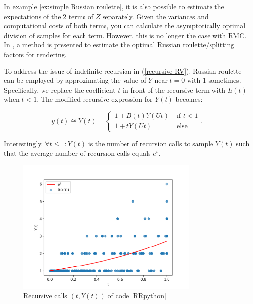 \documentclass[a4paper,12pt]{article}
\begin{document}
\begin{related}
    In example \ref{ex:simple Russian roulette}, it is also
    possible to estimate the expectations of the $2$ terms
    of $Z$ separately. Given the variances and computational costs
    of both terms, you can calculate the asymptotically optimal division
    of samples for each term. However, this is no longer the case with RMC.
    In \cite{rath_ears_2022}, a method is presented to estimate the optimal
    Russian roulette/splitting factors for rendering.
\end{related}


\begin{example} \label{ex: russian roulette}
    To address the issue of indefinite recursion in
    (\ref{recursive RV}), Russian roulette can be employed
    by approximating the value of $Y$ near $t = 0$ with $1$
    sometimes. Specifically, we replace the coefficient $t$
    in front of the recursive term with $B(t)$ when $t < 1$.
    The modified recursive expression for $Y(t)$ becomes:

    \begin{equation}\label{eq:rr example}
        y(t) \cong Y(t) =
        \begin{cases}
            1 + B(t)Y(Ut) & \text{ if } t < 1 \\
            1 + tY(Ut)    & \text{ else}
        \end{cases}.
    \end{equation}
\end{example}

\vspace{0.2cm}

\begin{pythonn} \label{RRpython}
    Interestingly, $\forall t \le 1:Y(t)$ is the number of recursion calls
    to sample $Y(t)$ such that the average number of recursion
    calls equals $e^{t}$.
    \begin{figure}[h!]
        \centering
        \includegraphics[width=0.8\textwidth]{plots/russian roulette example.png}
        \caption{Recursive calls $(t,Y(t))$ of code \ref{RRpython} }
        \label{fig:russian roulette}
    \end{figure}

\end{pythonn}
\end{document}
